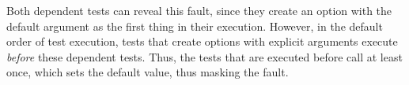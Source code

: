 Both dependent tests
can reveal this fault, since they create an option with 
the default argument as the first thing in their execution. However,
in the default order of test execution, 
tests that create options with explicit arguments execute \emph{before} 
these dependent tests.
Thus, the tests that are executed before call  at least once, which
sets the default  value, thus masking the fault.








%



